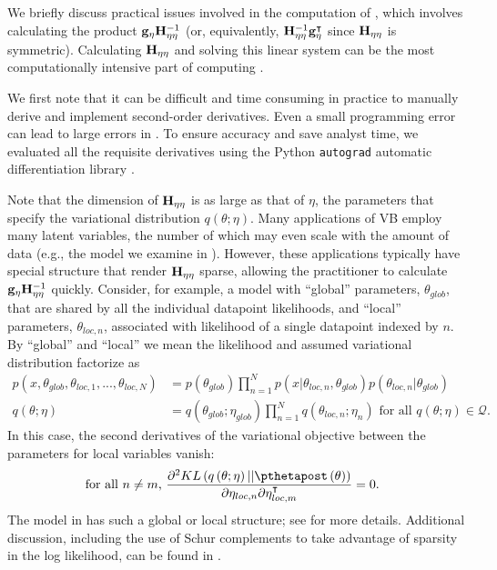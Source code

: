 \documentclass{article}\usepackage[]{graphicx}\usepackage[]{color}
\theoremstyle{plain}
\theoremstyle{definition}
\theoremstyle{plain}
\theoremstyle{plain}
\theoremstyle{plain}
\theoremstyle{plain}
\begin{document}
We briefly discuss practical issues involved in the computation of
, which involves calculating the product
$\mathbf{g}_{\eta}\mathbf{H}_{\eta\eta}^{-1}$ (or, equivalently, $\mathbf{H}_{\eta\eta}^{-1}\mathbf{g}_{\eta}^{\intercal}$
since $\mathbf{H}_{\eta\eta}$ is symmetric). Calculating $\mathbf{H}_{\eta\eta}$ and solving
this linear system can be the most computationally intensive part
of computing . 

We first note that it can be difficult and time consuming in practice
to manually derive and implement second-order derivatives. Even a
small programming error can lead to large errors in .
To ensure accuracy and save analyst time, we evaluated all the requisite
derivatives using the Python \texttt{autograd} automatic differentiation
library \citep{maclaurin:2015:autograd}.

Note that the dimension of $\mathbf{H}_{\eta\eta}$ is as large as that of $\eta$,
the parameters that specify the variational distribution $q\left(\theta;\eta\right)$.
Many applications of VB employ many latent variables, the number of
which may even scale with the amount of data (e.g., the model we examine
in ). However, these applications typically
have special structure that render $\mathbf{H}_{\eta\eta}$ sparse, allowing the
practitioner to calculate $\mathbf{g}_{\eta}\mathbf{H}_{\eta\eta}^{-1}$ quickly. Consider,
for example, a model with ``global'' parameters, $\theta_{glob}$,
that are shared by all the individual datapoint likelihoods, and ``local''
parameters, $\theta_{loc,n}$, associated with likelihood of a single
datapoint indexed by $n$. By ``global'' and ``local'' we mean
the likelihood and assumed variational distribution factorize as
\begin{align}
p\left(x,\theta_{glob},\theta_{loc,1},...,\theta_{loc,N}\right) & =p\left(\theta_{glob}\right)\prod_{n=1}^{N}p\left(x\vert\theta_{loc,n},\theta_{glob}\right)p\left(\theta_{loc,n}\vert\theta_{glob}\right)\label{eq:global_local}\\
q\left(\theta;\eta\right) & =q\left(\theta_{glob};\eta_{glob}\right)\prod_{n=1}^{N}q\left(\theta_{loc,n};\eta_{n}\right)\textrm{ for all }q\left(\theta;\eta\right)\in\mathcal{Q}.\nonumber 
\end{align}
In this case, the second derivatives of the variational objective
between the parameters for local variables vanish:
\begin{align*}
\textrm{ for all }n\ne m\textrm{, }\frac{\partial^{2}KL\left(q\left(\theta;\eta\right)||\pthetapost\left(\theta\right)\right)}{\partial\eta_{loc,n}\partial\eta_{loc,m}^{\trans}} & =0.
\end{align*}
The model in  has such a global or local
structure; see  for more details.
Additional discussion, including the use of Schur complements to take
advantage of sparsity in the log likelihood, can be found in \citet{giordano:2015:lrvb}.
\end{document}
